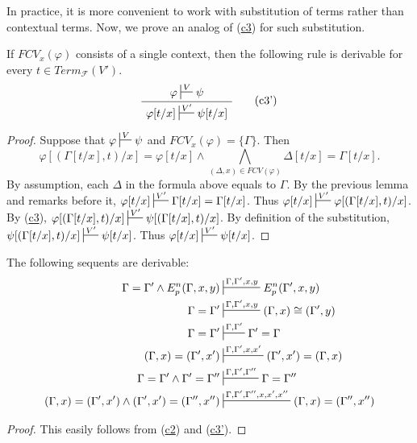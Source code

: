 \documentclass[reqno]{amsart}
\newcommand{\axtag}[1]{\label{ax:#1} \tag{#1}}
\newcommand{\axref}[1]{(\hyperref[ax:#1]{#1})}
\theoremstyle{definition}
\theoremstyle{remark}
\numberwithin{figure}{section}
\begin{document}
In practice, it is more convenient to work with substitution of terms rather than contextual terms.
Now, we prove an analog of \axref{c3} for such substitution.

\begin{prop}
If $FCV_x(\varphi)$ consists of a single context, then the following rule is derivable for every $t \in Term_\mathcal{F}(V')$.
\begin{equation}
\AxiomC{$\varphi \sststile{}{V} \psi$}
\UnaryInfC{$\varphi[t/x] \sststile{}{V'} \psi[t/x]$}
\DisplayProof
\axtag{c3'}
\end{equation}
\end{prop}
\begin{proof}
Suppose that $\varphi \sststile{}{V} \psi$ and $FCV_x(\varphi) = \{ \Gamma \}$.
Then \[ \varphi[(\Gamma[t/x],t)/x] = \varphi[t/x] \land \bigwedge\limits_{(\Delta,x) \in FCV(\varphi)} \Delta[t/x] = \Gamma[t/x]. \]
By assumption, each $\Delta$ in the formula above equals to $\Gamma$.
By the previous lemma and remarks before it, $\varphi[t/x] \sststile{}{V'} \Gamma[t/x] = \Gamma[t/x]$.
Thus $\varphi[t/x] \sststile{}{V'} \varphi[(\Gamma[t/x],t)/x]$.
By \axref{c3}, $\varphi[(\Gamma[t/x],t)/x] \sststile{}{V'} \psi[(\Gamma[t/x],t)/x]$.
By definition of the substitution, $\psi[(\Gamma[t/x],t)/x] \sststile{}{V'} \psi[t/x]$.
Thus $\varphi[t/x] \sststile{}{V'} \psi[t/x]$.
\end{proof}

\begin{prop}
The following sequents are derivable:
\begin{align*}
\Gamma = \Gamma' \land E^n_p(\Gamma, x, y) & \sststile{}{\Gamma, \Gamma', x, y} E^n_p(\Gamma', x, y) \\
\Gamma = \Gamma' & \sststile{}{\Gamma, \Gamma', x, y} (\Gamma,x) \cong (\Gamma',y) \\
\Gamma = \Gamma' & \sststile{}{\Gamma, \Gamma'} \Gamma' = \Gamma \\
(\Gamma,x) = (\Gamma',x') & \sststile{}{\Gamma, \Gamma', x, x'} (\Gamma',x') = (\Gamma,x) \\
\Gamma = \Gamma' \land \Gamma' = \Gamma'' & \sststile{}{\Gamma, \Gamma', \Gamma''} \Gamma = \Gamma'' \\
(\Gamma,x) = (\Gamma',x') \land (\Gamma',x') = (\Gamma'',x'') & \sststile{}{\Gamma, \Gamma', \Gamma'', x, x', x''} (\Gamma,x) = (\Gamma'',x'')
\end{align*}
\end{prop}
\begin{proof}
This easily follows from \axref{c2} and \axref{c3'}.
\end{proof}
\end{document}
